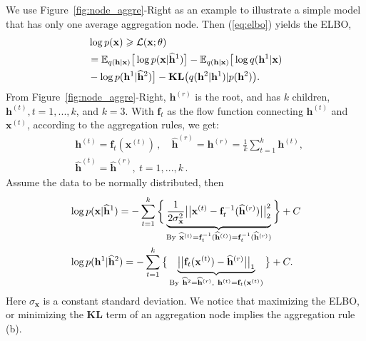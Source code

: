 \documentclass[sigconf, anonymous, review]{acmart}
\theoremstyle{plain}
\theoremstyle{definition}
\theoremstyle{remark}
\begin{document}
We use Figure~\ref{fig:node_aggre}-Right as an example to illustrate a simple model that  has only one average aggregation node. Then (\ref{eq:elbo}) yields the ELBO,
\begin{align}  \label{eq:one_agg_node}
&\log p(\mathbf{x})   \geqslant  \mathcal{L}(\mathbf{x}; \theta) \\ \notag
&= \mathbb{E}_{q(\mathbf{h} | \mathbf{x})} \big[\log p(\mathbf{x}|\widehat{\mathbf{h}}^1)\big] -\mathbb{E}_{q(\mathbf{h} | \mathbf{x})} \big[\log q(\mathbf{h}^1 | \mathbf{x})\\ \notag
& -\log p(\mathbf{h}^1|\widehat{\mathbf{h}}^2)\big] - \textbf{\text{KL}}\big(q(\mathbf{h}^2 | \mathbf{h}^1) | p(\mathbf{h}^2)\big).
\end{align}
From  Figure~\ref{fig:node_aggre}-Right,  $\mathbf{h}^{(r)}$ is the root, and has $k$ children, $\mathbf{h}^{(t)}, t = 1,...,k$, and $k=3$. 
With $\mathbf{f}_t$ as the flow function connecting $\mathbf{h}^{(t)}$ and $\mathbf{x}^{(t)}$, according to the aggregation rules, we get:
\begin{equation}
\begin{split}
& \mathbf{h}^{(t)} = \mathbf{f}_t(\mathbf{x}^{(t)})\, ,\quad  \widehat{\mathbf{h}}^{(r)} = \mathbf{h}^{(r)} = \frac{1}{k}\sum_{t=1}^k \mathbf{h}^{(t)} , \\
&\widehat{\mathbf{h}}^{(t)}= \widehat{\mathbf{h}}^{(r)}, \ t = 1,...,k \, .
 \end{split}
\end{equation}
 Assume the data to be normally distributed, then 
\begin{align}\notag
 &\log p(\mathbf{x}|\widehat{\mathbf{h}}^1) 
 =-\sum_{t=1}^k\bigg\{ \underbrace{\frac{1}{2\sigma^2_{\mathbf{x}}}\big|\big| \mathbf{x}^{(t)} - \mathbf{f}_t^{-1}(\widehat{\mathbf{h}}^{(r)})\big|\big|_2^2 }_{\textrm{By} \  \widehat{\mathbf{x}}^{(t)}=\mathbf{f}_t^{-1}(\widehat{\mathbf{h}}^{(t)})=\mathbf{f}_t^{-1}(\widehat{\mathbf{h}}^{(r)})} \bigg\}+C \\
 &  \log p(\mathbf{h}^1|\widehat{\mathbf{h}}^2) = -\sum_{t=1}^k\big\{ \underbrace{\big|\big|  \mathbf{f}_t(\mathbf{x}^{(t)}) - \widehat{\mathbf{h}}^{(r)}\big|\big|_1}_{\textrm{By} \  \widehat{\mathbf{h}}^{2}= \widehat{\mathbf{h}}^{(r)}, \  \mathbf{h}^{(t)} = \mathbf{f}_t(\mathbf{x}^{(t)})} \big\} +C .
 \end{align} 
 Here $\sigma_{\mathbf{x}}$ is a constant standard deviation. 
We notice that maximizing the ELBO, or minimizing the $\mathbf{KL}$ term of an aggregation node implies the aggregation rule (b). 
\end{document}
